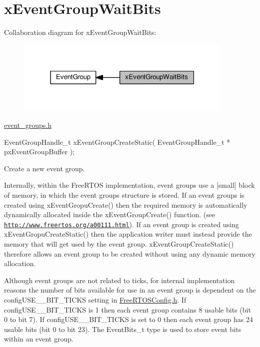\hypertarget{group__x_event_group_wait_bits}{}\section{x\+Event\+Group\+Wait\+Bits}
\label{group__x_event_group_wait_bits}
Collaboration diagram for x\+Event\+Group\+Wait\+Bits\+:\nopagebreak
\begin{figure}[H]
\begin{center}
\leavevmode
\includegraphics[width=295pt]{group__x_event_group_wait_bits}
\end{center}
\end{figure}
\hyperlink{event__groups_8h}{event\+\_\+groups.\+h} 
\begin{DoxyPre}
EventGroupHandle\_t xEventGroupCreateStatic( EventGroupHandle\_t * pxEventGroupBuffer );
\end{DoxyPre}


Create a new event group.

Internally, within the Free\+R\+T\+OS implementation, event groups use a \mbox{[}small\mbox{]} block of memory, in which the event group\textquotesingle{}s structure is stored. If an event groups is created using x\+Event\+Gropu\+Create() then the required memory is automatically dynamically allocated inside the x\+Event\+Group\+Create() function. (see \href{http://www.freertos.org/a00111.html}{\tt http\+://www.\+freertos.\+org/a00111.\+html}). If an event group is created using x\+Event\+Gropu\+Create\+Static() then the application writer must instead provide the memory that will get used by the event group. x\+Event\+Group\+Create\+Static() therefore allows an event group to be created without using any dynamic memory allocation.

Although event groups are not related to ticks, for internal implementation reasons the number of bits available for use in an event group is dependent on the config\+U\+S\+E\+\_\+\_\+\+B\+I\+T\+\_\+\+T\+I\+C\+KS setting in \hyperlink{_free_r_t_o_s_config_8h}{Free\+R\+T\+O\+S\+Config.\+h}. If config\+U\+S\+E\+\_\+\_\+\+B\+I\+T\+\_\+\+T\+I\+C\+KS is 1 then each event group contains 8 usable bits (bit 0 to bit 7). If config\+U\+S\+E\+\_\+\_\+\+B\+I\+T\+\_\+\+T\+I\+C\+KS is set to 0 then each event group has 24 usable bits (bit 0 to bit 23). The Event\+Bits\+\_\+t type is used to store event bits within an event group.


